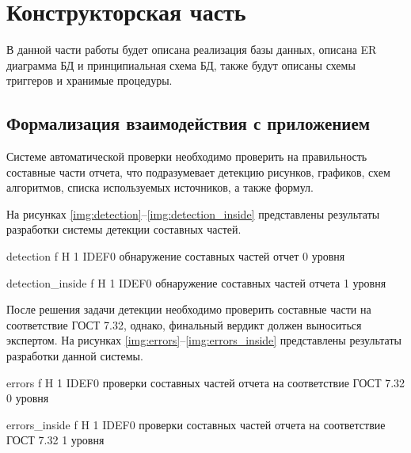 
\chapter{Конструкторская часть}
В данной части работы будет описана реализация базы данных, описана ER диаграмма БД и принципиальная схема БД, также будут описаны схемы триггеров и хранимые процедуры.


\section{Формализация взаимодействия с приложением}


Системе автоматической проверки необходимо проверить на правильность составные части отчета, что подразумевает детекцию рисунков, графиков, схем алгоритмов, списка используемых источников, а также формул.

На рисунках \ref{img:detection}--\ref{img:detection_inside} представлены результаты разработки системы детекции составных частей.

{detection} %
{f} %
{H} %
{1\textwidth} %
{IDEF0 обнаружение составных частей отчет 0 уровня} %

{detection_inside} %
{f} %
{H} %
{1\textwidth} %
{IDEF0 обнаружение составных частей отчета 1 уровня} %

После решения задачи детекции необходимо проверить составные части на соответствие ГОСТ 7.32, однако, финальный вердикт должен выноситься экспертом. На рисунках \ref{img:errors}--\ref{img:errors_inside} представлены результаты разработки данной системы.

{errors} %
{f} %
{H} %
{1\textwidth} %
{IDEF0 проверки составных частей отчета на соответствие ГОСТ 7.32 0 уровня} %

{errors_inside} %
{f} %
{H} %
{1\textwidth} %
{IDEF0 проверки составных частей отчета на соответствие ГОСТ 7.32 1 уровня} %

